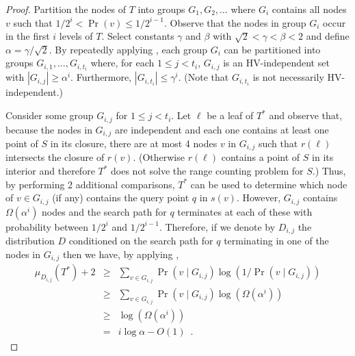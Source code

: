 \documentclass{patmorin}
\begin{document}
\begin{proof}
Partition the nodes of $T$ into groups $G_1,G_2,\ldots$ where $G_i$
contains all nodes $v$ such that $1/2^{i} < \Pr(v) \le 1/2^{i-1}$.
Observe that the nodes in group $G_i$ occur in the first $i$ levels of
$T$.  Select constants $\gamma$ and $\beta$ with $\sqrt{2} < \gamma
< \beta < 2$ and define $\alpha=\gamma/\sqrt{2}$.  By
repeatedly applying , each group $G_i$ can be
partitioned into groups $G_{i,1},\ldots,G_{i,t_i}$ where, for each $1
\le j < t_i$, $G_{i,j}$ is an HV-independent set with $|G_{i,j}|
\ge \alpha^i$.  Furthermore, $|G_{i,t_i}| \le \gamma^i$. (Note that
$G_{i,t_i}$ is not necessarily HV-independent.)

Consider some group $G_{i,j}$ for $1\le j < t_i$.  Let $\ell$ be a
leaf of $T^*$ and observe that, because the nodes in $G_{i,j}$ are
independent and each one contains at least one point of $S$ in its
closure, there are at most 4 nodes $v$ in $G_{i,j}$ such that
$r(\ell)$ intersects the closure of $r(v)$.  (Otherwise $r(\ell)$
contains a point of $S$ in its interior and therefore $T^*$ does not
solve the range counting problem for $S$.) Thus, by performing 2 
additional comparisons, $T^*$ can be used to determine which node of
$v\in G_{i,j}$ (if any) contains the query point $q$ in $s(v)$.
However, $G_{i,j}$ contains $\Omega(\alpha^i)$ nodes and the search
path for $q$ terminates at each of these with probability between
$1/2^i$ and $1/2^{i-1}$.  Therefore, if we denote by $D_{i,j}$ the
distribution $D$ conditioned on the search path for $q$ terminating in
one of the nodes in $G_{i,j}$ then we have, by applying
,
\begin{eqnarray*}
   \mu_{D_{i,j}}(T^*) + 2 
    & \ge & \sum_{v\in G_{i,j}}\Pr(v\mid G_{i,j})\log(1/\Pr(v\mid G_{i,j})) \\
    & \ge & \sum_{v\in G_{i,j}}\Pr(v\mid G_{i,j})\log(\Omega(\alpha^i)) \\
    & \ge & \log(\Omega(\alpha^i)) \\
    & = & i\log\alpha - O(1) \enspace .
\end{eqnarray*}


\end{proof}
\end{document}

